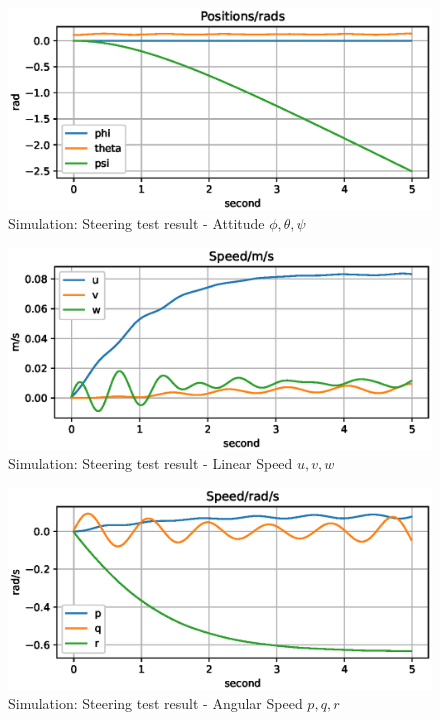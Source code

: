\begin{figure}[H]
    \centering
    \includegraphics[width=.8\textwidth]{images/04steer-test-ptp.eps}
    \caption{Simulation: Steering test result - Attitude $\phi, \theta, \psi$}
    \label{fig:04steer-test-ptp}
\end{figure}

\begin{figure}[H]
    \centering
    \includegraphics[width=.8\textwidth]{images/04steer-test-uvw.eps}
    \caption{Simulation: Steering test result - Linear Speed $u, v, w$}
    \label{fig:04steer-test-uvw}
\end{figure}

\begin{figure}[H]
    \centering
    \includegraphics[width=.8\textwidth]{images/04steer-test-pqr.eps}
    \caption{Simulation: Steering test result - Angular Speed $p, q, r$}
    \label{fig:04steer-test-pqr}
\end{figure}